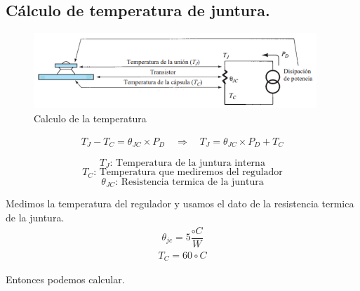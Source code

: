 \subsection{Cálculo de temperatura de juntura.}

\begin{figure}[H]
  \centering
  \includegraphics[width=0.95\textwidth]{images/calculoTemperatura.png}
  \caption{Calculo de la temperatura}
\end{figure}

\begin{equation}
  \begin{aligned}
    T_J - T_C = \theta_{JC} \times P_D \quad \Rightarrow \quad T_J = \theta_{JC} \times P_D + T_C
   \end{aligned}
\end{equation}

\begin{equation}
  T_J \text{: Temperatura de la juntura interna}
\end{equation}
\begin{equation}
  T_C \text{: Temperatura que mediremos del regulador}
\end{equation}
\begin{equation}
  \theta_{JC} \text{: Resistencia termica de la juntura}
\end{equation}

Medimos la temperatura del regulador y usamos el dato de la resistencia termica de la juntura. \\

\begin{equation}
  \begin{aligned}
    \theta_{jc} = 5\dfrac{\circ C}{W}
  \end{aligned}
\end{equation}
\begin{equation}
  \begin{aligned}
    T_C = 60 \circ C
  \end{aligned}
\end{equation}

Entonces podemos calcular. \\

